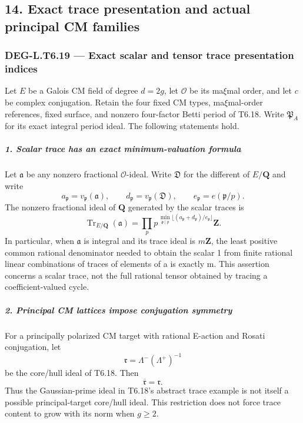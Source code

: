 \documentclass[11pt,a4paper]{article}
\theoremstyle{definition}
\begin{document}
\subsection{14. Exact trace presentation and actual principal CM families}\label{exact-trace-presentation-and-actual-principal-cm-families}

\subsubsection{DEG-L.T6.19 --- Exact scalar and tensor trace presentation indices}\label{DEG-L.T6.19}

Let \(E\) be a Galois CM field of degree \(d=2g\), let \(\mathcal O\) be its ma\(\xi\)mal order, and let \(c\) be complex conjugation. Retain the four fixed CM types, ma\(\xi\)mal-order references, fixed surface, and nonzero four-factor Betti period of T6.18. Write \(\mathfrak P_A\) for its exact integral period ideal. The following statements hold.

\subparagraph{1. Scalar trace has an exact minimum-valuation formula}\label{scalar-trace-has-an-exact-minimum-valuation-formula}

Let \(\mathfrak a\) be any nonzero fractional \(\mathcal O\)-ideal. Write \(\mathfrak D\) for the different of \(E/\mathbf Q\) and write \[
 a_{\mathfrak p}=v_{\mathfrak p}(\mathfrak a),\qquad
 d_{\mathfrak p}=v_{\mathfrak p}(\mathfrak D),\qquad
 e_{\mathfrak p}=e(\mathfrak p/p).
\] The nonzero fractional ideal of \(\mathbf Q\) generated by the scalar traces is \[
 \operatorname{Tr}_{E/\mathbf Q}(\mathfrak a)
 =\prod_p p^{\,\min_{\mathfrak p\mid p}
       \lfloor(a_{\mathfrak p}+d_{\mathfrak p})/e_{\mathfrak p}\rfloor}\mathbf Z.
 \tag{T19.1}
\] In particular, when \(\mathfrak a\) is integral and its trace ideal is \(m\mathbf Z\), the least positive common rational denominator needed to obtain the scalar 1 from finite rational linear combinations of traces of elements of a is exactly m. This assertion concerns a scalar trace, not the full rational tensor obtained by tracing a coefficient-valued cycle.

\subparagraph{2. Principal CM lattices impose conjugation symmetry}\label{principal-cm-lattices-impose-conjugation-symmetry}

For a principally polarized CM target with rational E-action and Rosati conjugation, let \[
 \mathfrak r=\Lambda^-(\Lambda^+)^{-1}
\] be the core/hull ideal of T6.18. Then \[
 \overline{\mathfrak r}=\mathfrak r.
 \tag{T19.2}
\] Thus the Gaussian-prime ideal in T6.18's abstract trace example is not itself a possible principal-target core/hull ideal. This restriction does not force trace content to grow with its norm when \(g\ge2\).
\end{document}
